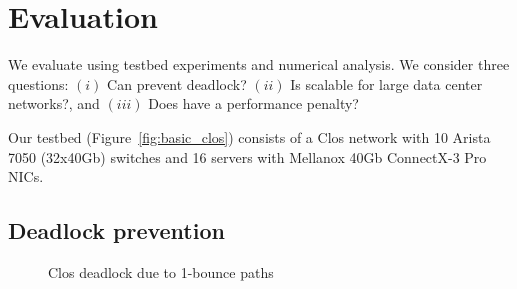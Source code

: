 \section{Evaluation}\label{sec:eval}

We evaluate \sysname{} using testbed experiments and numerical analysis.  We
consider three questions: $(i)$ Can \sysname{} prevent deadlock?  $(ii)$ Is
\sysname{} scalable for large data center networks?, and $(iii)$ Does \sysname{}
have a performance penalty?


 Our testbed (Figure~\ref{fig:basic_clos}) consists of a Clos
network with 10 Arista 7050 (32x40Gb) switches and 16 servers with Mellanox 40Gb
ConnectX-3 Pro NICs.  

\subsection{Deadlock prevention}\label{subsec:exp_validation}

\begin{figure}[t]
	\centering
	
	
	\caption{Clos deadlock due to 1-bounce paths}\label{fig:exp_validation_nonloop}
	\vspace{-0.15in}
\end{figure}

